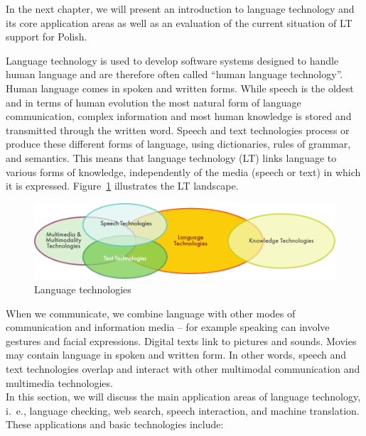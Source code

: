 \begin{multicols}{2}
In the next chapter, we will present an introduction to language
technology and its core application areas as well as an evaluation of
the current situation of LT support for Polish. 

\end{multicols} 

\clearpage 


\begin{multicols}{2} 

Language technology is used to develop software systems designed to
handle human language and are therefore often called “human language
technology”. Human language comes in spoken and written forms. While
speech is the oldest and in terms of human evolution the most natural
form of language communication, complex information and most human
knowledge is stored and transmitted through the written word. Speech
and text technologies process or produce these different forms of
language, using dictionaries, rules of grammar, and semantics. This
means that language technology (LT) links language to various forms of
knowledge, independently of the media (speech or text) in which it is
expressed. Figure~\ref{fig: ltincontext_en} illustrates the LT
landscape. 

\begin{figure}[htb]  \center
\includegraphics[width=\textwidth]{../_media/english/language_technologies}
\caption{Language technologies} \label{fig: ltincontext_en}
 \end{figure} 

When we communicate, we combine language with other modes of
communication and information media -- for example speaking can
involve gestures and facial expressions. Digital texts link to
pictures and sounds. Movies may contain language in spoken and written
form. In other words, speech and text technologies overlap and
interact with other multimodal communication and multimedia
technologies.\\
In this section, we will discuss the main application areas of
language technology, i.\, e., language checking, web search, speech
interaction, and machine translation. These applications and basic
technologies include: 


\end{multicols}
